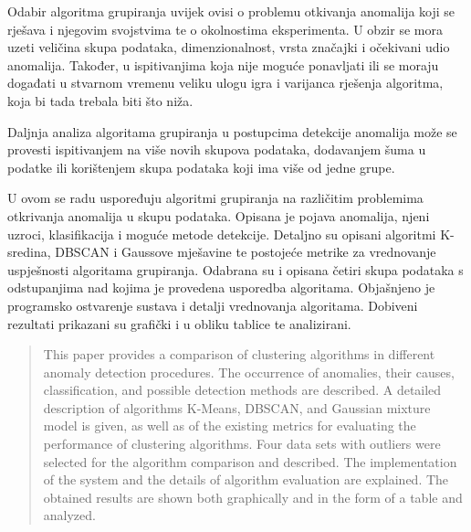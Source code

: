 \documentclass[utf8, diplomski, numeric]{fer}
\begin{document}
Odabir algoritma grupiranja uvijek ovisi o problemu otkivanja anomalija koji se rješava i njegovim svojstvima te o okolnostima eksperimenta. U obzir se mora uzeti veličina skupa podataka, dimenzionalnost, vrsta značajki i očekivani udio anomalija. Također, u ispitivanjima koja nije moguće ponavljati ili se moraju događati u stvarnom vremenu veliku ulogu igra i varijanca rješenja algoritma, koja bi tada trebala biti što niža. 

Daljnja analiza algoritama grupiranja u postupcima detekcije anomalija može se provesti ispitivanjem na više novih skupova podataka, dodavanjem šuma u podatke ili korištenjem skupa podataka koji ima više od jedne grupe.

\nocite{*}



\begin{sazetak}
U ovom se radu uspoređuju algoritmi grupiranja na različitim problemima otkrivanja anomalija u skupu podataka. Opisana je pojava anomalija, njeni uzroci, klasifikacija i moguće metode detekcije. Detaljno su opisani algoritmi K-sredina, DBSCAN i Gaussove mješavine te postojeće metrike za vrednovanje uspješnosti algoritama grupiranja. Odabrana su i opisana četiri skupa podataka s odstupanjima nad kojima je provedena usporedba algoritama. Objašnjeno je programsko ostvarenje sustava i detalji vrednovanja algoritama. Dobiveni rezultati prikazani su grafički i u obliku tablice te analizirani.

\end{sazetak}

\begin{abstract}
This paper provides a comparison of clustering algorithms in different anomaly detection procedures. The occurrence of anomalies, their causes, classification, and possible detection methods are described. A detailed description of algorithms K-Means, DBSCAN, and Gaussian mixture model is given, as well as of the existing metrics for evaluating the performance of clustering algorithms. Four data sets with outliers were selected for the algorithm comparison and described. The implementation of the system and the details of algorithm evaluation are explained. The obtained results are shown both graphically and in the form of a table and analyzed.

\end{abstract}
\end{document}
